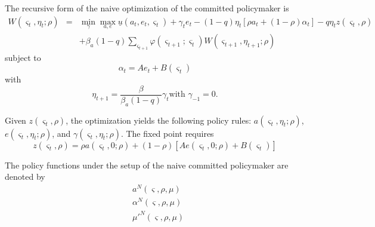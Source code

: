 \documentclass[12pt,letter,leqno]{article}
\theoremstyle{asn}
\theoremstyle{lem}
\theoremstyle{slem}
\theoremstyle{prop}
\theoremstyle{appprop}
\theoremstyle{rem}
\theoremstyle{defn}
\begin{document}
The recursive form of the naive optimization of the committed policymaker is%
\begin{eqnarray*}
W\left( \varsigma _{t},\eta _{t};\rho \right)  &=&\min_{\gamma }\max_{a,e}%
\underline{u}(a_{t},e_{t},\varsigma _{t})+\gamma _{t}e_{t}-\left( 1-q\right)
\eta _{t}\left[ \rho a_{t}+\left( 1-\rho \right) \alpha _{t}\right] -q\eta
_{t}z\left( \varsigma _{t},\rho \right)  \\
&&+\beta _{a}\left( 1-q\right) \sum_{\varsigma _{t+1}}\varphi \left(
\varsigma _{t+1};\varsigma _{t}\right) W\left( \varsigma _{t+1},\eta
_{t+1};\rho \right) 
\end{eqnarray*}%
subject to%
\[
\alpha _{t}=Ae_{t}+B\left( \varsigma _{t}\right) 
\]%
with%
\[
\eta _{t+1}=\frac{\beta }{\beta _{a}\left( 1-q\right) }\gamma _{t}\text{
with }\gamma _{-1}=0.
\]

\bigskip 

Given $z\left( \varsigma _{t},\rho \right) $, the optimization yields the
following policy rules: $a\left( \varsigma _{t},\eta _{t};\rho \right)$, $e\left( \varsigma _{t},\eta _{t};\rho \right)$, and $\gamma\left( \varsigma _{t},\eta _{t};\rho \right)$. The fixed point requires
\[
z\left( \varsigma _{t},\rho \right) =\rho a\left( \varsigma _{t},0;\rho
\right) +\left( 1-\rho \right) \left[ Ae\left( \varsigma _{t},0;\rho \right)
+B\left( \varsigma _{t}\right) \right] 
\]


The policy functions under the setup of the naive committed policymaker are denoted by
\begin{align*}
& a^N(\varsigma,\rho,\mu) \\
& \alpha^N(\varsigma,\rho,\mu) \\
& \mu'^N(\varsigma,\rho,\mu)
\end{align*}
\end{document}
